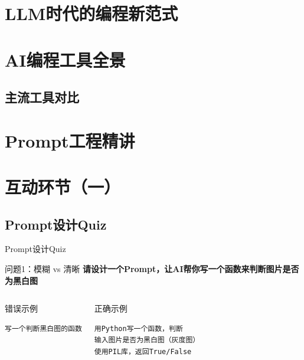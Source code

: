\documentclass[aspectratio=169, 10pt]{beamer}
\begin{document}
\section{LLM时代的编程新范式}


\section{AI编程工具全景}
\subsection{主流工具对比}


\section{Prompt工程精讲}


\section{互动环节（一）}
\subsection{Prompt设计Quiz}
\begin{frame}[fragile]{Prompt设计Quiz}
	\begin{block}{问题1：模糊 vs 清晰}
		\textbf{请设计一个Prompt，让AI帮你写一个函数来判断图片是否为黑白图}
	\end{block}

	\vspace{0.5cm}

	\begin{columns}
		\begin{block}{错误示例}
			\small
			\begin{verbatim}
写一个判断黑白图的函数
			\end{verbatim}
		\end{block}

		\begin{block}{正确示例}
			\small
			\begin{verbatim}
用Python写一个函数，判断
输入图片是否为黑白图（灰度图）
使用PIL库，返回True/False
			\end{verbatim}
		\end{block}
	\end{columns}
\end{frame}
\end{document}
